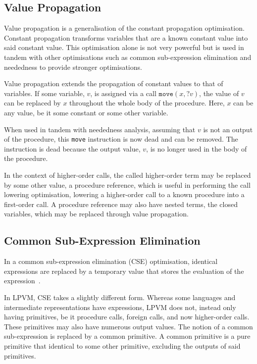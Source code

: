 \subsection{Value Propagation}
\label{ssec:value-propagation}

Value propagation is a generalisation of the constant propagation optimisation. Constant propagation transforms variables that are a known constant value into said constant value. This optimisation alone is not very powerful but is used in tandem with other optimisations such as common sub-expression elimination and neededness to provide stronger optimisations.

Value propagation extends the propagation of constant values to that of variables. If some variable, $v$, is assigned via a call $\mathtt{move}(x, ?v)$, the value of $v$ can be replaced by $x$ throughout the whole body of the procedure. Here, $x$ can be any value, be it some constant or some other variable.

When used in tandem with neededness analysis, assuming that $v$ is not an output of the procedure, this \texttt{move} instruction is now dead and can be removed. The instruction is dead because the output value, $v$, is no longer used in the body of the procedure.

In the context of higher-order calls, the called higher-order term may be replaced by some other value, a procedure reference, which is useful in performing the call lowering optimisation, lowering a higher-order call to a known procedure into a first-order call. A procedure reference may also have nested terms, the closed variables, which may be replaced through value propagation.

\subsection{Common Sub-Expression Elimination}
\label{ssec:common-sub-expression-limination}

In a common sub-expression elimination (CSE) optimisation, identical expressions are replaced by a temporary value that stores the evaluation of the expression~\cite{cocke1970global}.

In LPVM, CSE takes a slightly different form. Whereas some languages and intermediate representations have expressions, LPVM does not, instead only having primitives, be it procedure calls, foreign calls, and now higher-order calls. These primitives may also have numerous output values. The notion of a common sub-expression is replaced by a common primitive. A common primitive is a pure primitive that identical to some other primitive, excluding the outputs of said primitives. 

